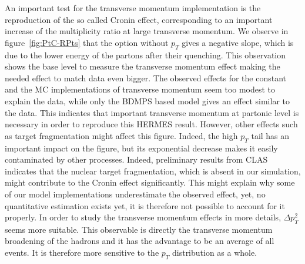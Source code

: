 An important test for the transverse momentum implementation is the reproduction of the so called Cronin effect, corresponding to an important increase of the multiplicity ratio at large transverse momentum. We observe in figure~\ref{fig:PtC-RPts} that the option without $p_T$ gives a negative slope, which is due to the lower energy of the partons after their quenching. This observation shows the base level to measure the transverse momentum effect making the needed effect to match data even bigger. The observed effects for the constant and the MC implementations of transverse momentum seem too modest to explain the data, while only the BDMPS based model gives an effect similar to the data. This indicates that important transverse momentum at partonic level is necessary in order to reproduce this HERMES result. However, other effects such as target fragmentation might affect this figure. Indeed, the high $p_T$ tail has an important impact on the figure, but its exponential decrease makes it easily contaminated by other processes. Indeed, preliminary results from CLAS \cite{dupre-th} indicates that the nuclear target fragmentation, which is absent in our simulation, might contribute to the Cronin effect significantly. This might explain why some of our model implementations underestimate the observed effect, yet, no quantitative estimation exists yet, it is therefore not possible to account for it properly. In order to study the transverse momentum effects in more details, $\Delta p_T^2$ seems more suitable. This observable is directly the transverse momentum broadening of the hadrons and it has the advantage to be an average of all events. It is therefore more sensitive to the $p_T$ distribution as a whole.


